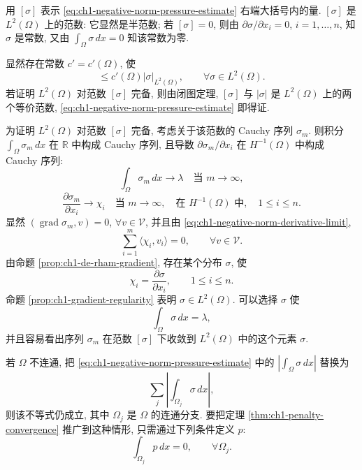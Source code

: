 \begin{Proof}
用 $[\sigma]$ 表示 \eqref{eq:ch1-negative-norm-pressure-estimate} 右端大括号内的量. $[\sigma]$ 是 $L^2(\Omega)$ 上的范数: 它显然是半范数; 若 $[\sigma]=0$, 则由 $\partial\sigma/\partial x_i=0$, $i=1,\ldots,n$, 知 $\sigma$ 是常数, 又由 $\int_\Omega\sigma\,dx=0$ 知该常数为零.

显然存在常数 $c'=c'(\Omega)$, 使
\begin{equation}
[\sigma]\leq c'(\Omega)\lvert\sigma\rvert_{L^2(\Omega)},
\qquad\forall\sigma\in L^2(\Omega).
\label{eq:ch1-negative-norm-upper-bound}
\end{equation}
若证明 $L^2(\Omega)$ 对范数 $[\sigma]$ 完备, 则由闭图定理, $[\sigma]$ 与 $\lvert\sigma\rvert$ 是 $L^2(\Omega)$ 上的两个等价范数, \eqref{eq:ch1-negative-norm-pressure-estimate} 即得证.

为证明 $L^2(\Omega)$ 对范数 $[\sigma]$ 完备, 考虑关于该范数的 Cauchy 序列 $\sigma_m$. 则积分 $\int_\Omega\sigma_m\,dx$ 在 $\mathbb R$ 中构成 Cauchy 序列, 且导数 $\partial\sigma_m/\partial x_i$ 在 $H^{-1}(\Omega)$ 中构成 Cauchy 序列:
\begin{equation}
\int_\Omega\sigma_m\,dx\longrightarrow\lambda
\quad\text{当 }m\to\infty,
\label{eq:ch1-negative-norm-integral-limit}
\end{equation}
\begin{equation}
\frac{\partial\sigma_m}{\partial x_i}\longrightarrow\chi_i
\quad\text{当 }m\to\infty,
\quad\text{在 }H^{-1}(\Omega)\text{ 中},\quad1\leq i\leq n.
\label{eq:ch1-negative-norm-derivative-limit}
\end{equation}
显然 $(\operatorname{grad}\sigma_m,v)=0$, $\forall v\in\mathcal V$, 并且由 \eqref{eq:ch1-negative-norm-derivative-limit},
\[
\sum_{i=1}^{m}\langle\chi_i,v_i\rangle=0,
\qquad\forall v\in\mathcal V.
\]
由命题 \ref{prop:ch1-de-rham-gradient}, 存在某个分布 $\sigma$, 使
\[
\chi_i=\frac{\partial\sigma}{\partial x_i},
\qquad1\leq i\leq n.
\]
命题 \ref{prop:ch1-gradient-regularity} 表明 $\sigma\in L^2(\Omega)$. 可以选择 $\sigma$ 使
\[
\int_\Omega\sigma\,dx=\lambda,
\]
并且容易看出序列 $\sigma_m$ 在范数 $[\sigma]$ 下收敛到 $L^2(\Omega)$ 中的这个元素 $\sigma$.
\end{Proof}

\begin{Remark}
\label{rem:ch1-negative-norm-disconnected-domain}
若 $\Omega$ 不连通, 把 \eqref{eq:ch1-negative-norm-pressure-estimate} 中的 $\left\lvert\int_\Omega\sigma\,dx\right\rvert$ 替换为
\[
\sum_j\left\lvert\int_{\Omega_j}\sigma\,dx\right\rvert,
\]
则该不等式仍成立, 其中 $\Omega_j$ 是 $\Omega$ 的连通分支. 要把定理 \ref{thm:ch1-penalty-convergence} 推广到这种情形, 只需通过下列条件定义 $p$:
\begin{equation}
\int_{\Omega_j}p\,dx=0,
\qquad\forall\Omega_j.
\label{eq:ch1-penalty-component-pressure-zero-mean}
\end{equation}
\end{Remark}

